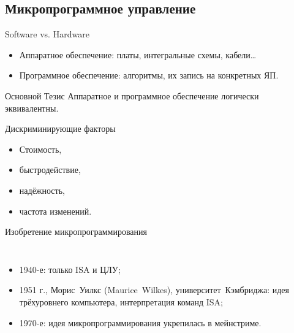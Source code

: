 \subsection{Микропрограммное управление}

\begin{frame}{Software vs. Hardware}
\begin{itemize}\small
\item Аппаратное обеспечение: платы, интегральные схемы, кабели…
\item Программное обеспечение: алгоритмы, их запись на конкретных ЯП.
\end{itemize}

\pause\begin{block}{Основной Тезис}
Аппаратное и программное обеспечение логически эквивалентны.
\end{block}


{\small\pause\begin{block}{Дискриминирующие факторы}
\pause\begin{itemize}
\addtolength{\itemsep}{-0.3\baselineskip}
    \item Стоимость,
    \item быстродействие,
    \item надёжность,
    \item частота изменений.
\end{itemize}
\end{block}}
\end{frame}

\begin{frame}{Изобретение микропрограммирования}
\begin{columns}
    \column{6cm}
\begin{itemize}[<+->]\itemsep=.7cm
    \item 1940-е: только ISA и ЦЛУ;
    \item 1951 г., Морис~Уилкс (Maurice~Wilkes), университет~Кэмбриджа: идея трёхуровнего компьютера, интерпретация команд ISA;
    \item 1970-е: идея микропрограммирования укрепилась в мейнстриме.
\end{itemize}

    \column{5.5cm}
\end{columns}
\end{frame}

